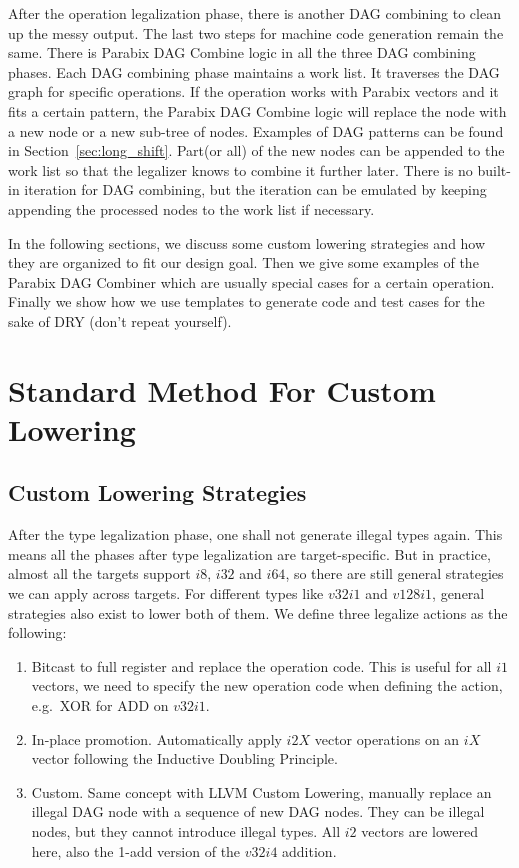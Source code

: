 After the operation legalization phase, there is another DAG combining to clean up the messy output. The last two steps for machine code generation remain the same. There is Parabix DAG Combine logic in all the three DAG combining phases. Each DAG combining phase maintains a work list. It traverses the DAG graph for specific operations. If the operation works with Parabix vectors and it fits a certain pattern, the Parabix DAG Combine logic will replace the node with a new node or a new sub-tree of nodes. Examples of DAG patterns can be found in Section~\ref{sec:long_shift}. Part(or all) of the new nodes can be appended to the work list so that the legalizer knows to combine it further later. There is no built-in iteration for DAG combining, but the iteration can be emulated by keeping appending the processed nodes to the work list if necessary.

In the following sections, we discuss some custom lowering strategies and how they are organized to fit our design goal. Then we give some examples of the Parabix DAG Combiner which are usually special cases for a certain operation. Finally we show how we use templates to generate code and test cases for the sake of DRY (don't repeat yourself).

\section{Standard Method For Custom Lowering}
\subsection{Custom Lowering Strategies}
After the type legalization phase, one shall not generate illegal types again. This means all the phases after type legalization are target-specific. But in practice, almost all the targets support $i8$, $i32$ and $i64$, so there are still general strategies we can apply across targets. For different types like $v32i1$ and $v128i1$, general strategies also exist to lower both of them. We define three legalize actions as the following:
\begin{enumerate}
    \item Bitcast to full register and replace the operation code. This is useful for all $i1$ vectors, we need to specify the new operation code when defining the action, e.g.\ XOR for ADD on $v32i1$.
    \item In-place promotion. Automatically apply $i2X$ vector operations on an $iX$ vector following the Inductive Doubling Principle.
    \item Custom. Same concept with LLVM Custom Lowering, manually replace an illegal DAG node with a sequence of new DAG nodes. They can be illegal nodes, but they cannot introduce illegal types. All $i2$ vectors are lowered here, also the 1-add version of the $v32i4$ addition.
\end{enumerate}


